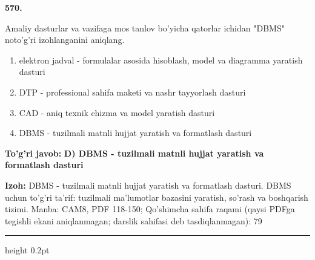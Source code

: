 \documentclass[10pt,a4paper]{article}
\begin{document}
{\bfseries\sffamily\color{ink} 570.}
\par
Amaliy dasturlar va vazifaga mos tanlov bo'yicha qatorlar ichidan "DBMS" noto'g'ri izohlanganini aniqlang.
\begin{enumerate}[label=\Alph*),leftmargin=9mm]
\item elektron jadval - formulalar asosida hisoblash, model va diagramma yaratish dasturi
\item DTP - professional sahifa maketi va nashr tayyorlash dasturi
\item CAD - aniq texnik chizma va model yaratish dasturi
\item DBMS - tuzilmali matnli hujjat yaratish va formatlash dasturi
\end{enumerate}
\begin{tcolorbox}[enhanced,breakable,colback=teal!4,colframe=teal!60!black,boxrule=0.45pt,arc=1.2mm,left=2.7mm,right=2.7mm,top=1.8mm,bottom=1.8mm,before skip=2mm,after skip=2mm]
{\bfseries\sffamily\color{teal}To'g'ri javob:} \textbf{D) DBMS - tuzilmali matnli hujjat yaratish va formatlash dasturi}
\par\smallskip
{\bfseries Izoh:} DBMS - tuzilmali matnli hujjat yaratish va formatlash dasturi. DBMS uchun to'g'ri ta'rif: tuzilmali ma'lumotlar bazasini yaratish, so'rash va boshqarish tizimi. Manba: CAM8, PDF 118-150; Qo'shimcha sahifa raqami (qaysi PDFga tegishli ekani aniqlanmagan; darslik sahifasi deb tasdiqlanmagan): 79
\end{tcolorbox}
\vspace{2mm}\hrule height 0.2pt\vspace{3mm}
\end{document}
